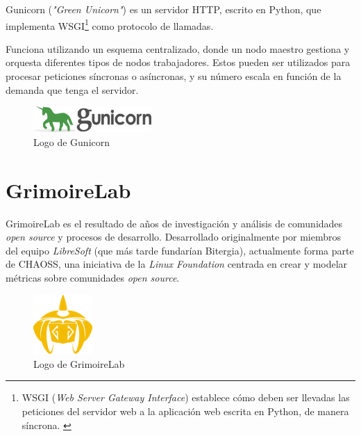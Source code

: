 Gunicorn (\emph{"Green Unicorn"}) es un servidor HTTP, escrito en Python, que implementa WSGI\footnote{WSGI (\emph{Web Server Gateway Interface}) establece cómo deben ser llevadas las peticiones del servidor web a la aplicación web escrita en Python, de manera síncrona. \emph{\parencite{Reference11}}} como protocolo de llamadas.

Funciona utilizando un esquema centralizado, donde un nodo maestro gestiona y orquesta diferentes tipos de nodos trabajadores. Estos pueden ser utilizados para procesar peticiones síncronas o asíncronas, y su número escala en función de la demanda que tenga el servidor. \emph{\parencite{Reference9}}

\begin{figure}[ht]
    \centering
    \includegraphics[width=0.4\textwidth]{Figures/gunicorn-logo}
    \decoRule
    \caption[Gunicorn (Logo)]{Logo de Gunicorn \emph{\parencite{Reference10}}}
    \label{fig:gunicorn-logo}
\end{figure}


\section{GrimoireLab}\label{sec:grimoirelab}

GrimoireLab es el resultado de años de investigación y análisis de comunidades \emph{open source} y procesos de desarrollo. Desarrollado originalmente por miembros del equipo \emph{LibreSoft} (que más tarde fundarían Bitergia), actualmente forma parte de CHAOSS, una iniciativa de la \emph{Linux Foundation} centrada en crear y modelar métricas sobre comunidades \emph{open source}. \emph{\parencite{Reference12}}

\begin{figure}[ht]
    \centering
    \includegraphics[width=0.2\textwidth]{Figures/grimoirelab-logo}
    \decoRule
    \caption[GrimoireLab (Logo)]{Logo de GrimoireLab \emph{\parencite{Reference12}}}
    \label{fig:grimoirelab-logo}
\end{figure}

